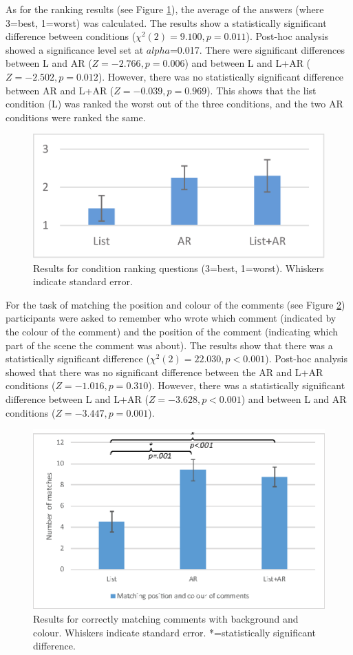 As for the ranking results (see Figure \ref{fig:mgia16:ranking}), the average of the answers (where 3=best, 1=worst) was calculated. The results show a statistically significant difference between conditions ($\chi^2(2)=9.100, p=0.011$). Post-hoc analysis showed a significance level set at $alpha$=0.017. There were significant differences between L and AR ($Z=-2.766, p=0.006$) and between L and L+AR ($Z=-2.502, p=0.012$). However, there was no statistically significant difference between AR and L+AR ($Z=-0.039, p=0.969$). This shows that the list condition (L) was ranked the worst out of the three conditions, and the two AR conditions were ranked the same.

\begin{figure}[htb]
  \centering
  \includegraphics[width=.4\linewidth]{images/61-video-mgia16/ranking.eps}
  \caption{Results for condition ranking questions (3=best, 1=worst). Whiskers indicate standard error.}
    \label{fig:mgia16:ranking}
\end{figure}

For the task of matching the position and colour of the comments (see Figure \ref{fig:mgia16:questions_matching}) participants were asked to remember who wrote which comment (indicated by the colour of the comment) and the position of the comment (indicating which part of the scene the comment was about). The results show that there was a statistically significant difference ($\chi^2(2)=22.030, p<0.001$). Post-hoc analysis showed that there was no significant difference between the AR and L+AR conditions ($Z=-1.016, p=0.310$). However, there was a statistically significant difference between L and L+AR ($Z=-3.628, p<0.001$) and between L and AR conditions ($Z=-3.447, p=0.001$).

\begin{figure}[thb]
  \centering
  \includegraphics[width=.8\linewidth]{images/61-video-mgia16/matching-02.eps}
  \caption{Results for correctly matching comments with background and colour. Whiskers indicate standard error. *=statistically significant difference.}
    \label{fig:mgia16:questions_matching}
\end{figure}

